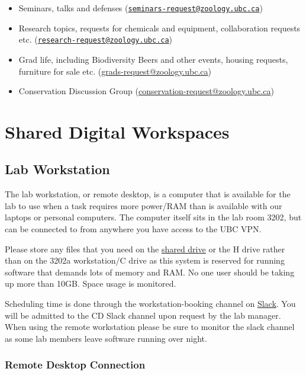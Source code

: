 \documentclass[
]{book}
\providecommand{\tightlist}{%
  \setlength{\itemsep}{0pt}\setlength{\parskip}{0pt}}
\begin{document}
\begin{itemize}
\tightlist
\item
  Seminars, talks and defenses (\href{mailto:seminars-request@zoology.ubc.ca}{\nolinkurl{seminars-request@zoology.ubc.ca}})
\item
  Research topics, requests for chemicals and equipment, collaboration requests etc. (\href{mailto:research-request@zoology.ubc.ca}{\nolinkurl{research-request@zoology.ubc.ca}})
\item
  Grad life, including Biodiversity Beers and other events, housing requests, furniture for sale etc. (\url{grads-request@zoology.ubc.ca})
\item
  Conservation Discussion Group (\url{conservation-request@zoology.ubc.ca})
\end{itemize}

\hypertarget{shareddigital}{%
\chapter*{Shared Digital Workspaces}\label{shareddigital}}

\hypertarget{workstation}{%
\section*{Lab Workstation}\label{workstation}}

The lab workstation, or remote desktop, is a computer that is available for the lab to use when a task requires more power/RAM than is available with our laptops or personal computers. The computer itself sits in the lab room 3202, but can be connected to from anywhere you have access to the UBC VPN.

Please store any files that you need on the \href{sharednetworkdrive}{shared drive} or the H drive rather than on the 3202a workstation/C drive as this system is reserved for running software that demands lots of memory and RAM. No one user should be taking up more than 10GB. Space usage is monitored.

Scheduling time is done through the workstation-booking channel on \protect\hyperlink{slack}{Slack}. You will be admitted to the CD Slack channel upon request by the lab manager. When using the remote workstation please be sure to monitor the slack channel as some lab members leave software running over night.

\hypertarget{remoteconnect}{%
\subsection*{Remote Desktop Connection}\label{remoteconnect}}
\end{document}
